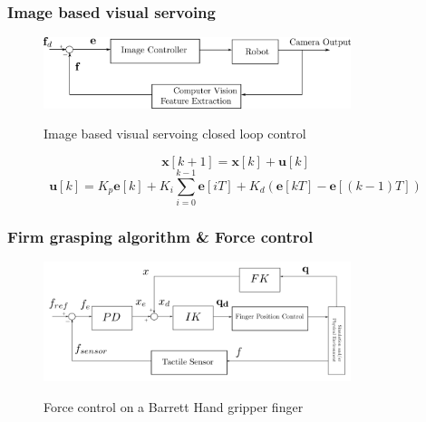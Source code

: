 \begin{frame}
\frametitle{Image based visual servoing}

\begin{center}
\begin{figure}[!htb]
\centering
\includegraphics[width=0.8\textwidth]{../images/visual-servoing-image-based.png}\\
\caption{Image based visual servoing closed loop control}
\label{visual-servoing-image-based-control}
\end{figure}

\[
\mathbf{x}[k+1] = \mathbf{x}[k] + \mathbf{u}[k]
\]
\[
\mathbf{u}[k] = K_p\mathbf{e}[k] + K_i \sum_{i=0}^{k-1} \mathbf{e}[iT] + K_d \left( \mathbf{e}[kT] - \mathbf{e}[(k-1)T] \right)
\]
\end{center}
\end{frame}


\begin{frame}
\frametitle{Firm grasping algorithm \& Force control}
\begin{center}
\begin{figure}[!htb]
\centering
\includegraphics[width=0.8\textwidth]{../images/finger-force-control.png}\\
\caption{Force control on a Barrett Hand gripper finger}
\label{finger-force-control}
\end{figure}
\end{center}
\end{frame}
